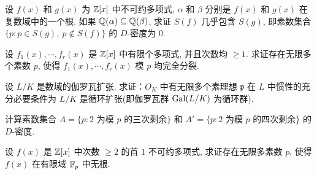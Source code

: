 \begin{Exercises}
  \item 设 $f(x)$ 和 $g(x)$ 为 $\mathbb{Z}[x]$ 中不可约多项式, $\alpha$ 和 $\beta$ 分别是 $f(x)$ 和 $g(x)$ 在复数域中的一个根. 如果 $\mathbb{Q}(\alpha)\subseteq\mathbb{Q}(\beta)$, 求证 $S(f)$ 几乎包含 $S(g)$, 即素数集合 $\{p:p\in S(g),\ p\notin S(f)\}$ 的 $D$-密度为 $0$. 
  \item 设 $f_1(x),\cdots,f_r(x)$ 是 $\mathbb{Z}[x]$ 中有限个多项式, 并且次数均 $\geqslant 1$. 求证存在无限多个素数 $p$, 使得 $f_1(x),\cdots,f_r(x)$ 模 $p$ 均完全分裂. 
  \item 设 $L/K$ 是数域的伽罗瓦扩张. 求证：$O_K$ 中有无限多个素理想 $\mathfrak{p}$ 在 $L$ 中惯性的充分必要条件为 $L/K$ 是循环扩张(即伽罗瓦群 $\operatorname{Gal}(L/K)$ 为循环群). 
  \item 计算素数集合 $A=\{p:2$ 为模 $p$ 的三次剩余$\}$ 和 $A'=\{p:2$ 为模 $p$ 的四次剩余$\}$ 的 $D$-密度. 
  \item 设 $f(x)$ 是 $\mathbb{Z}[x]$ 中次数 $\geqslant 2$ 的首 $1$ 不可约多项式, 求证存在无限多素数 $p$, 使得 $f(x)$ 在有限域 $\mathbb{F}_p$ 中无根. 
\end{Exercises}
